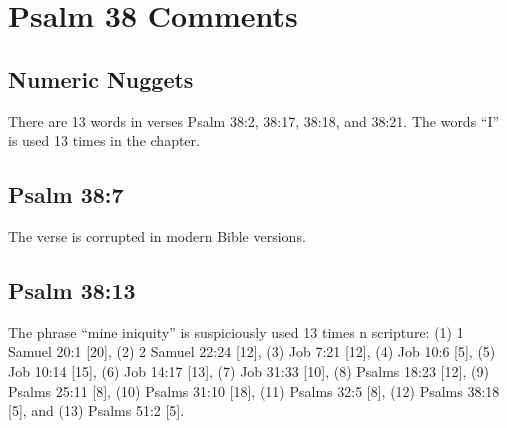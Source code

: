 \section{Psalm 38 Comments}

\subsection{Numeric Nuggets}
There are 13 words in verses Psalm 38:2, 38:17, 38:18, and 38:21. The words ``I'' is used 13 times in the chapter.

\subsection{Psalm 38:7}
The verse is corrupted in modern Bible versions.



\subsection{Psalm 38:13}
The phrase ``mine iniquity'' is suspiciously used 13 times n scripture: (1) 1 Samuel 20:1 [20], (2) 2 Samuel 22:24 [12], (3) Job 7:21 [12], (4) Job 10:6 [5], (5) Job 10:14 [15], (6) Job 14:17 [13], (7) Job 31:33 [10], (8) Psalms 18:23 [12], (9) Psalms 25:11 [8], (10) Psalms 31:10 [18], (11) Psalms 32:5 [8], (12) Psalms 38:18 [5], and (13) Psalms 51:2 [5].

